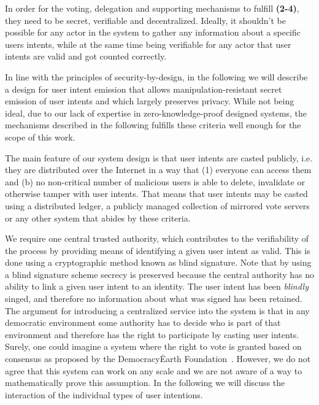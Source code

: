 In order for the voting, delegation and supporting mechanisms to fulfill \textbf{(2-4)}, they need to be secret, verifiable and decentralized.
Ideally, it shouldn't be possible for any actor in the system to gather any information about a specific users intents, while at the same time being verifiable for any actor that user intents are valid and got counted correctly. 

In line with the principles of security-by-design, in the following we will describe a design for user intent emission that allows manipulation-resistant secret emission of user intents and which largely preserves privacy.
While not being ideal, due to our lack of expertise in zero-knowledge-proof designed systems, the mechanisms described in the following fulfills these criteria well enough for the scope of this work.

The main feature of our system design is that user intents are casted publicly, i.e. they are distributed over the Internet in a way that (1) everyone can access them and (b) no non-critical number of malicious users is able to delete, invalidate or otherwise tamper with user intents.
That means that user intents may be casted using a distributed ledger, a publicly managed collection of mirrored vote servers or any other system that abides by these criteria.

We require one central trusted authority, which contributes to the verifiability of the process by providing means of identifying a given user intent as valid.
This is done using a cryptographic method known as blind signature.
Note that by using a blind signature scheme secrecy is preserved because the central authority has no ability to link a given user intent to an identity.
The user intent has been \emph{blindly} singed, and therefore no information about what was signed has been retained. 
The argument for introducing a centralized service into the system is that in any democratic environment some authority has to decide who is part of that environment and therefore has the right to participate by casting user intents.
Surely, one could imagine a system where the right to vote is granted based on consensus as proposed by the Democracy\.Earth Foundation~\parencite{DemocracyEarth2018}.
However, we do not agree that this system can work on any scale and we are not aware of a way to mathematically prove this assumption.
In the following we will discuss the interaction of the individual types of user intentions.

